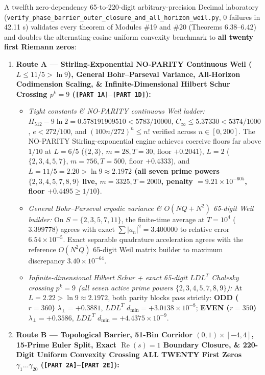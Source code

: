 \documentclass[
  11pt,
]{article}
\providecommand{\tightlist}{%
  \setlength{\itemsep}{0pt}\setlength{\parskip}{0pt}}
\begin{document}
A twelfth zero-dependency 65-to-220-digit arbitrary-precision Decimal
laboratory
(\texttt{verify\_phase\_barrier\_outer\_closure\_and\_all\_horizon\_weil.py},
0 failures in 42.11 s) validates every theorem of Modules \#19 and \#20
(Theorems 6.38--6.42) and doubles the alternating-cosine uniform
convexity benchmark to \textbf{all twenty first Riemann zeros}:

\begin{enumerate}
\def\labelenumi{\arabic{enumi}.}
\tightlist
\item
  \textbf{Route A --- Stirling-Exponential NO-PARITY Continuous Weil
  (\(L \le 11/5 > \ln 9\)), General Bohr--Parseval Variance, All-Horizon
  Codimension Scaling, \& Infinite-Dimensional Hilbert Schur Crossing
  \(p^k = 9\) (\texttt{{[}PART\ 1A{]}}--\texttt{{[}PART\ 1D{]}}):}

  \begin{itemize}
  \tightlist
  \item
    \emph{Tight constants \& NO-PARITY continuous Weil ladder:}
    \(H_{512} - 9\ln 2 = 0.578191909510 < 5783/10000\),
    \(C_\infty \le 5.37330 < 5374/1000\), \(e < 272/100\), and
    \((100n/272)^n \le n!\) verified across \(n \in [0, 200]\). The
    NO-PARITY Stirling-exponential engine achieves coercive floors far
    above \(1/10\) at \(L = 6/5\) (\(\{2, 3\}\), \(m = 28, T = 30\),
    floor \(+0.2041\)), \(L = 2\) (\(\{2, 3, 4, 5, 7\}\),
    \(m = 756, T = 500\), floor \(+0.4333\)), and
    \textbf{\(L = 11/5 = 2.20 > \ln 9 \approx 2.1972\) (all seven prime
    powers \(\{2, 3, 4, 5, 7, 8, 9\}\) live, \(m = 3325, T = 2000\),
    penalty \(= 9.21 \times 10^{-605}\), floor \(+0.4495 \ge 1/10\))}.
  \item
    \emph{General Bohr--Parseval ergodic variance \& \(O(NQ + N^2)\)
    65-digit Weil builder:} On \(S = \{2, 3, 5, 7, 11\}\), the
    finite-time average at \(T = 10^4\) (\(3.399778\)) agrees with exact
    \(\sum |a_n|^2 = 3.400000\) to relative error
    \(6.54 \times 10^{-5}\). Exact separable quadrature acceleration
    agrees with the reference \(O(N^2 Q)\) 65-digit Weil matrix builder
    to maximum discrepancy \(3.40 \times 10^{-64}\).
  \item
    \emph{Infinite-dimensional Hilbert Schur + exact 65-digit \(LDL^T\)
    Cholesky crossing \(p^k = 9\) (all seven active prime powers
    \(\{2, 3, 4, 5, 7, 8, 9\}\)):} At
    \textbf{\(L = 2.22 > \ln 9 \approx 2.1972\)}, both parity blocks
    pass strictly: \textbf{ODD (\(r = 360\))}
    \(\lambda_\perp = +0.3881\), \(LDL^T\)
    \(d_{\min} = +3.0138 \times 10^{-8}\); \textbf{EVEN (\(r = 350\))}
    \(\lambda_\perp = +0.3586\), \(LDL^T\)
    \(d_{\min} = +4.4375 \times 10^{-9}\).
  \end{itemize}
\item
  \textbf{Route B --- Topological Barrier, 51-Bin Corridor
  \((0, 1) \times [-4, 4]\), 15-Prime Euler Split, Exact
  \(\operatorname{Re}(s) = 1\) Boundary Closure, \& 220-Digit Uniform
  Convexity Crossing ALL TWENTY First Zeros
  \(\gamma_1 \dots \gamma_{20}\)
  (\texttt{{[}PART\ 2A{]}}--\texttt{{[}PART\ 2E{]}}):}


\end{enumerate}
\end{document}
